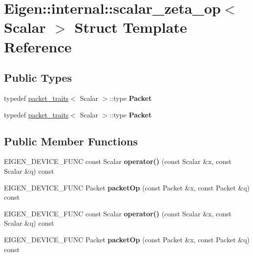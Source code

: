 \hypertarget{struct_eigen_1_1internal_1_1scalar__zeta__op}{}\section{Eigen\+:\+:internal\+:\+:scalar\+\_\+zeta\+\_\+op$<$ Scalar $>$ Struct Template Reference}
\label{struct_eigen_1_1internal_1_1scalar__zeta__op}
\subsection*{Public Types}
\begin{DoxyCompactItemize}
\item 
\mbox{\label{struct_eigen_1_1internal_1_1scalar__zeta__op_a1294ec9b1904ca7049454d682df67be2}} 
typedef \hyperlink{struct_eigen_1_1internal_1_1packet__traits}{packet\+\_\+traits}$<$ Scalar $>$\+::type {\bfseries Packet}
\item 
\mbox{\label{struct_eigen_1_1internal_1_1scalar__zeta__op_a1294ec9b1904ca7049454d682df67be2}} 
typedef \hyperlink{struct_eigen_1_1internal_1_1packet__traits}{packet\+\_\+traits}$<$ Scalar $>$\+::type {\bfseries Packet}
\end{DoxyCompactItemize}
\subsection*{Public Member Functions}
\begin{DoxyCompactItemize}
\item 
\mbox{\label{struct_eigen_1_1internal_1_1scalar__zeta__op_aff9f3c6a47117364cf8dd8d176eb88ff}} 
E\+I\+G\+E\+N\+\_\+\+D\+E\+V\+I\+C\+E\+\_\+\+F\+U\+NC const Scalar {\bfseries operator()} (const Scalar \&x, const Scalar \&q) const
\item 
\mbox{\label{struct_eigen_1_1internal_1_1scalar__zeta__op_a25854b992c6fdc70164f04c3096371d7}} 
E\+I\+G\+E\+N\+\_\+\+D\+E\+V\+I\+C\+E\+\_\+\+F\+U\+NC Packet {\bfseries packet\+Op} (const Packet \&x, const Packet \&q) const
\item 
\mbox{\label{struct_eigen_1_1internal_1_1scalar__zeta__op_aff9f3c6a47117364cf8dd8d176eb88ff}} 
E\+I\+G\+E\+N\+\_\+\+D\+E\+V\+I\+C\+E\+\_\+\+F\+U\+NC const Scalar {\bfseries operator()} (const Scalar \&x, const Scalar \&q) const
\item 
\mbox{\label{struct_eigen_1_1internal_1_1scalar__zeta__op_a25854b992c6fdc70164f04c3096371d7}} 
E\+I\+G\+E\+N\+\_\+\+D\+E\+V\+I\+C\+E\+\_\+\+F\+U\+NC Packet {\bfseries packet\+Op} (const Packet \&x, const Packet \&q) const
\end{DoxyCompactItemize}


